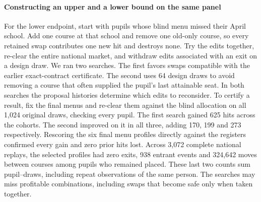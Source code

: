 \paragraph{Constructing an upper and a lower bound on the same panel}
For the lower endpoint, start with pupils whose blind menu missed their April school. Add one course at that school and remove one old-only course, so every retained swap contributes one new hit and destroys none. Try the edits together, re-clear the entire national market, and withdraw edits associated with an exit on a design draw. We ran two searches. The first favors swaps compatible with the earlier exact-contract certificate. The second uses 64 design draws to avoid removing a course that often supplied the pupil's last attainable seat. In both searches the proposal histories determine which edits to reconsider. To certify a result, fix the final menus and re-clear them against the blind allocation on all 1,024 original draws, checking every pupil. The first search gained 625 hits across the cohorts. The second improved on it in all three, adding 170, 199 and 273 respectively. Rescoring the six final menu profiles directly against the registers confirmed every gain and zero prior hits lost. Across 3,072 complete national replays, the selected profiles had zero exits, 938 entrant events and 324,642 moves between courses among pupils who remained placed. These last two counts sum pupil--draws, including repeat observations of the same person. The searches may miss profitable combinations, including swaps that become safe only when taken together.


